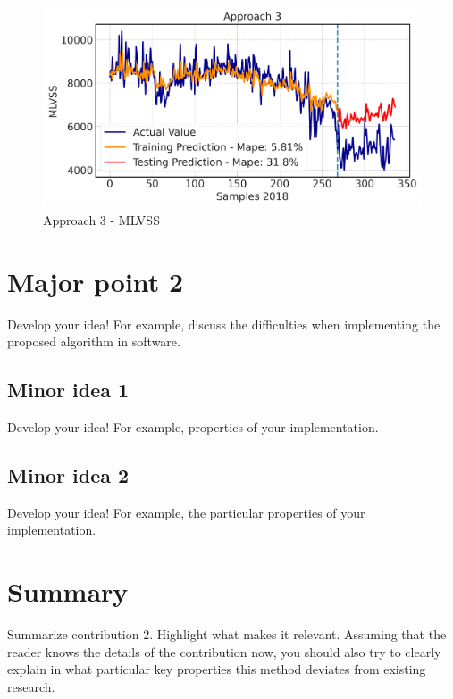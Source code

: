 \begin{figure}[h]
\centering
\includegraphics[width=\linewidth]{figures/Ch6/MVLSS-approach3.png}
\caption{Approach 3 - MLVSS}
\label{f:App3-MLVSS}
\end{figure}

\section{Major point 2}
\label{s:Contribution-2-Major-2}
Develop your idea! For example, discuss the difficulties when implementing the proposed algorithm in software.

\subsection{Minor idea 1}
\label{s:Contribution-2-Major-2-Minor-1}
Develop your idea! For example, properties of your implementation.




\subsection{Minor idea 2}
\label{s:Contribution-2-Major-2-Minor-2}
Develop your idea! For example, the particular properties of your implementation.




\section{Summary}
\label{s:Contribution-2-Summary}

Summarize contribution 2. Highlight what makes it relevant. Assuming that the reader knows the details of the contribution now, you should also try to clearly explain in what particular key properties this method deviates from existing research.

